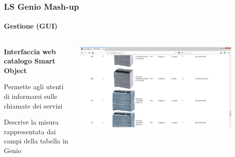 \documentclass{beamer}
\begin{document}
\begin{frame}
\frametitle{LS Genio Mash-up}
\framesubtitle{Gestione (GUI)}
\begin{columns}[T] %
	\begin{column}{.3\textwidth}
		
		\begin{itemize}
			{\tiny
				
				\item \textbf{Interfaccia web catalogo Smart Object}
				
				\begin{itemize}
					{\tiny
						\item Permette agli utenti di informarsi sulle chiamate dei servizi
						\item Descrive la misura rappresentata dai campi della tabella in Genio
					}
				\end{itemize}
				
			}
		\end{itemize}
		
	\end{column}%
	\hfill%
	\begin{column}{.66\textwidth}
		\includegraphics[width=0.9\textwidth]{images/SmartObjectsPlatform.png}
	\end{column}%
\end{columns}
\end{frame}
\end{document}
